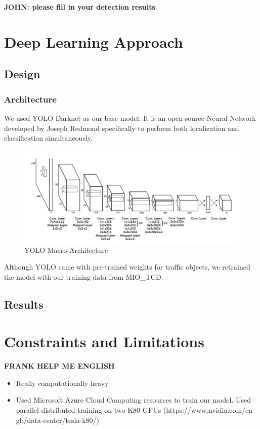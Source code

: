 \documentclass[12pt]{article}
\begin{document}
\textbf{JOHN: please fill in your detection results}

\section{Deep Learning Approach}

\subsection{Design}


\subsubsection{Architecture}

We used YOLO Darknet \cite{Darknet13} as our base model. It is an open-source Neural Network developed by Joseph Redmond specifically to perform both localization and classification simultaneously. 

\begin{figure}[!htb]
\includegraphics[width=\linewidth]{Darknet_Architecture.png}
\caption{YOLO Macro-Architecture}
\label{fig:darknet}
\end{figure}

Although YOLO came with pre-trained weights for traffic objects, we retrained the model with our training data from MIO\_TCD. 

\subsection{Results}





\section{Constraints and Limitations} 

\textbf{ FRANK HELP ME ENGLISH}
\begin{itemize}
    \item Really computationally heavy
    \item Used Microsoft Azure Cloud Computing resources to train our model. Used parallel distributed training on two K80 GPUs (https://www.nvidia.com/en-gb/data-center/tesla-k80/) 
\end{itemize}
\end{document}
